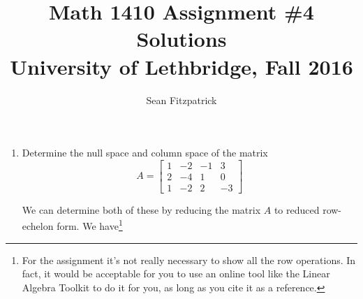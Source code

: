 \documentclass[letterpaper,12pt,reqno]{amsart}
\title{Math 1410 Assignment \#4 Solutions\\University of Lethbridge, Fall 2016}
\author{Sean Fitzpatrick}
\newcommand{\bbm}{\begin{bmatrix}}
\newcommand{\ebm}{\end{bmatrix}}
\begin{document}
 \maketitle

\begin{enumerate}
\item Determine the null space and column space of the matrix
\[
 A = \bbm 1&-2&-1&3\\2&-4&1&0\\1&-2&2&-3\ebm
\]

\bigskip

We can determine both of these by reducing the matrix $A$ to reduced row-echelon form. We have\footnote{For the assignment it's not really necessary to show all the row operations. In fact, it would be acceptable for you to use an online tool like the Linear Algebra Toolkit to do it for you, as long as you cite it as a reference.}


\end{enumerate}
\end{document}
